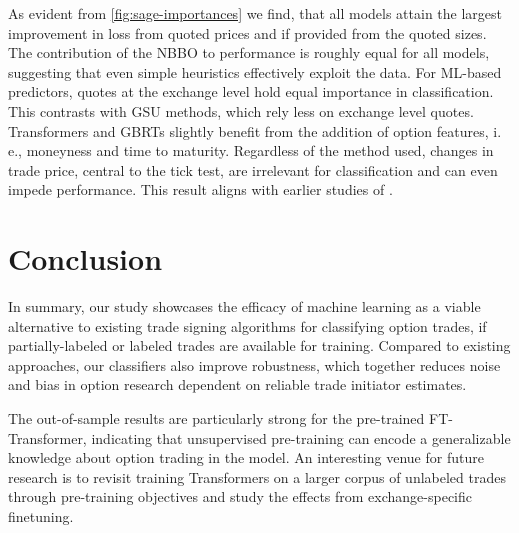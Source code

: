 As evident from \cref{fig:sage-importances} we find, that all models attain the largest improvement in loss from quoted prices and if provided from the quoted sizes. The contribution of the \gls{NBBO} to performance is roughly equal for all models, suggesting that even simple heuristics effectively exploit the data. For \gls{ML}-based predictors, quotes at the exchange level hold equal importance in classification. This contrasts with \gls{GSU} methods, which rely less on exchange level quotes. Transformers and \glspl{GBRT} slightly benefit from the addition of option features, i. e., moneyness and time to maturity. Regardless of the method used, changes in trade price, central to the tick test, are irrelevant for classification and can even impede performance. This result aligns with earlier studies of \textcites{savickasInferringDirectionOption2003}{grauerOptionTradeClassification2022}.

\section{Conclusion}

In summary, our study showcases the efficacy of machine learning as a viable alternative to existing trade signing algorithms for classifying option trades, if partially-labeled or labeled trades are available for training. Compared to existing approaches, our classifiers also improve robustness, which together reduces noise and bias in option research dependent on reliable trade initiator estimates.

The out-of-sample results are particularly strong for the pre-trained FT-Transformer, indicating that unsupervised pre-training can encode a generalizable knowledge about option trading in the model. An interesting venue for future research is to revisit training Transformers on a larger corpus of unlabeled trades through pre-training objectives and study the effects from exchange-specific finetuning.

